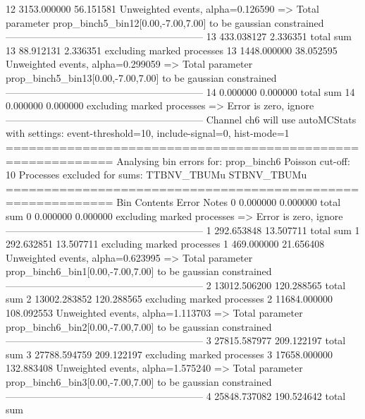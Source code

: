 12         3153.000000     56.151581       Unweighted events, alpha=0.126590
  => Total parameter prop_binch5_bin12[0.00,-7.00,7.00] to be gaussian constrained
------------------------------------------------------------
13         433.038127      2.336351        total sum                     
13         88.912131       2.336351        excluding marked processes    
13         1448.000000     38.052595       Unweighted events, alpha=0.299059
  => Total parameter prop_binch5_bin13[0.00,-7.00,7.00] to be gaussian constrained
------------------------------------------------------------
14         0.000000        0.000000        total sum                     
14         0.000000        0.000000        excluding marked processes    
  => Error is zero, ignore      
------------------------------------------------------------
Channel ch6 will use autoMCStats with settings: event-threshold=10, include-signal=0, hist-mode=1
============================================================
Analysing bin errors for: prop_binch6
Poisson cut-off: 10
Processes excluded for sums: TTBNV_TBUMu STBNV_TBUMu
============================================================
Bin        Contents        Error           Notes                         
0          0.000000        0.000000        total sum                     
0          0.000000        0.000000        excluding marked processes    
  => Error is zero, ignore      
------------------------------------------------------------
1          292.653848      13.507711       total sum                     
1          292.632851      13.507711       excluding marked processes    
1          469.000000      21.656408       Unweighted events, alpha=0.623995
  => Total parameter prop_binch6_bin1[0.00,-7.00,7.00] to be gaussian constrained
------------------------------------------------------------
2          13012.506200    120.288565      total sum                     
2          13002.283852    120.288565      excluding marked processes    
2          11684.000000    108.092553      Unweighted events, alpha=1.113703
  => Total parameter prop_binch6_bin2[0.00,-7.00,7.00] to be gaussian constrained
------------------------------------------------------------
3          27815.587977    209.122197      total sum                     
3          27788.594759    209.122197      excluding marked processes    
3          17658.000000    132.883408      Unweighted events, alpha=1.575240
  => Total parameter prop_binch6_bin3[0.00,-7.00,7.00] to be gaussian constrained
------------------------------------------------------------
4          25848.737082    190.524642      total sum                     
